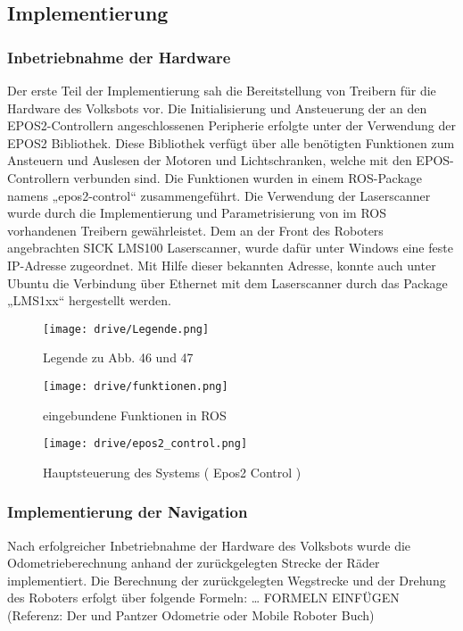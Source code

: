 \subsection{Implementierung}

\subsubsection{Inbetriebnahme der Hardware}
Der erste Teil der Implementierung sah die Bereitstellung von Treibern für die Hardware des Volksbots vor. Die Initialisierung und Ansteuerung der an den EPOS2-Controllern angeschlossenen Peripherie erfolgte unter der Verwendung der EPOS2 Bibliothek. Diese Bibliothek verfügt über alle benötigten Funktionen zum Ansteuern und Auslesen der Motoren und Lichtschranken, welche mit den EPOS-Controllern verbunden sind. Die Funktionen wurden in einem ROS-Package namens „epos2-control“ zusammengeführt.
Die Verwendung der Laserscanner wurde durch die Implementierung und Parametrisierung von im ROS vorhandenen Treibern gewährleistet. Dem an der Front des Roboters angebrachten SICK LMS100 Laserscanner, wurde dafür unter Windows eine feste IP-Adresse zugeordnet. Mit Hilfe dieser bekannten Adresse, konnte auch unter Ubuntu die Verbindung über Ethernet mit dem Laserscanner durch das Package „LMS1xx“  hergestellt werden.

\begin{figure}[h!]
 \centering
		\texttt{[image: drive/Legende.png]}
	\caption{Legende zu Abb. 46 und 47}
	\label{fig:Legende}
\end{figure}

\begin{figure}[h!]
 \centering
		\texttt{[image: drive/funktionen.png]}
	\caption{eingebundene Funktionen in ROS}
	\label{fig:funktionen}
\end{figure}

\begin{figure}[h!]
 \centering
		\texttt{[image: drive/epos2\_control.png]}
	\caption{Hauptsteuerung des Systems ( Epos2 Control )}
	\label{fig:epos2_control}
\end{figure}

\subsubsection{Implementierung der Navigation}
Nach erfolgreicher Inbetriebnahme der Hardware des Volksbots wurde die Odometrieberechnung anhand der zurückgelegten Strecke der Räder implementiert. Die Berechnung der zurückgelegten Wegstrecke und der Drehung des Roboters erfolgt über folgende Formeln: … FORMELN EINFÜGEN (Referenz: Der und Pantzer Odometrie oder Mobile Roboter Buch)

